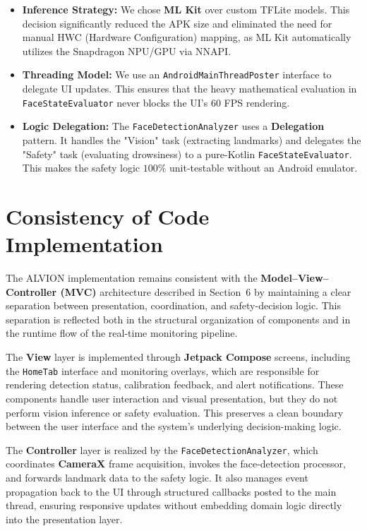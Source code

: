 \documentclass[11pt]{report}
\begin{document}
\begin{itemize}
    \item \textbf{Inference Strategy:} We chose \textbf{ML Kit} over custom TFLite models. This decision significantly reduced the APK size and eliminated the need for manual HWC (Hardware Configuration) mapping, as ML Kit automatically utilizes the Snapdragon NPU/GPU via NNAPI.
    \item \textbf{Threading Model:} We use an \texttt{AndroidMainThreadPoster} interface to delegate UI updates. This ensures that the heavy mathematical evaluation in \texttt{FaceStateEvaluator} never blocks the UI's 60 FPS rendering.
    \item \textbf{Logic Delegation:} The \texttt{FaceDetectionAnalyzer} uses a \textbf{Delegation} pattern. It handles the "Vision" task (extracting landmarks) and delegates the "Safety" task (evaluating drowsiness) to a pure-Kotlin \texttt{FaceStateEvaluator}. This makes the safety logic $100\%$ unit-testable without an Android emulator.
\end{itemize}

\section{Consistency of Code Implementation}\label{sec:patterns-consistency}

The ALVION implementation remains consistent with the \textbf{Model--View--Controller (MVC)} architecture described in Section~6 by maintaining a clear separation between presentation, coordination, and safety-decision logic. This separation is reflected both in the structural organization of components and in the runtime flow of the real-time monitoring pipeline.

The \textbf{View} layer is implemented through \textbf{Jetpack Compose} screens, including the \texttt{HomeTab} interface and monitoring overlays, which are responsible for rendering detection status, calibration feedback, and alert notifications. These components handle user interaction and visual presentation, but they do not perform vision inference or safety evaluation. This preserves a clean boundary between the user interface and the system's underlying decision-making logic.

The \textbf{Controller} layer is realized by the \texttt{FaceDetectionAnalyzer}, which coordinates \textbf{CameraX} frame acquisition, invokes the face-detection processor, and forwards landmark data to the safety logic. It also manages event propagation back to the UI through structured callbacks posted to the main thread, ensuring responsive updates without embedding domain logic directly into the presentation layer.
\end{document}
